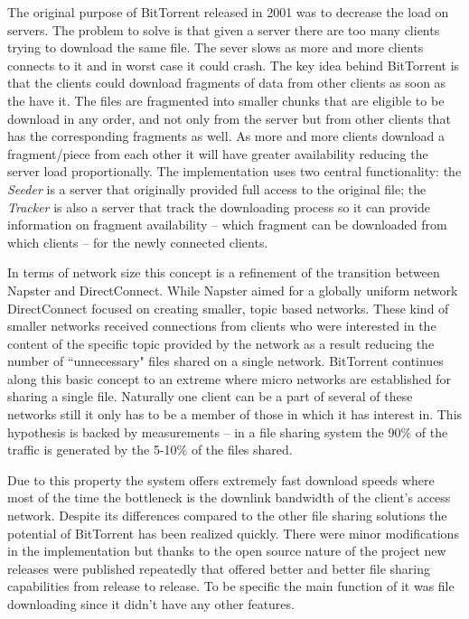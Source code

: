 \documentclass[a4paper]{article}
\begin{document}
The original purpose of BitTorrent released in 2001 was to decrease the load on servers. The problem to solve is that
given a server there are too many clients trying to download the same file. The sever slows as more and more clients
connects to it and in worst case it could crash. The key idea behind BitTorrent is that the clients could download
fragments of data from other clients as soon as the have it. The files are fragmented into smaller chunks that are
eligible to be download in any order, and not only from the server but from other clients that has the corresponding
fragments as well. As more and more clients download a fragment/piece from each other it will have greater availability
reducing the server load proportionally. The implementation uses two central functionality: the \emph{Seeder} is a
server that originally provided full access to the original file; the \emph{Tracker} is also a server that track the
downloading process so it can provide information on fragment availability -- which fragment can be downloaded from
which clients -- for the newly connected clients.

In terms of network size this concept is a refinement of the transition between Napster and DirectConnect. While
Napster aimed for a globally uniform network DirectConnect focused on creating smaller, topic based networks. These
kind of smaller networks received connections from clients who were interested in the content of the specific topic
provided by the network as a result reducing the number of ``unnecessary" files shared on a single network. BitTorrent
continues along this basic concept to an extreme where micro networks are established for sharing a single file.
Naturally one client can be a part of several of these networks still it only has to be a member of those in which it
has interest in. This hypothesis is backed by measurements -- in a file sharing system the 90\% of the traffic is
generated by the 5-10\% of the files shared.

Due to this property the system offers extremely fast download speeds where most of the time the bottleneck is the
downlink bandwidth of the client's access network. Despite its differences compared to the other file sharing solutions
the potential of BitTorrent has been realized quickly. There were minor modifications in the implementation but thanks
to the open source nature of the project new releases were published repeatedly that offered better and better file
sharing capabilities from release to release. To be specific the main function of it was file downloading since it
didn't have any other features.
\end{document}
